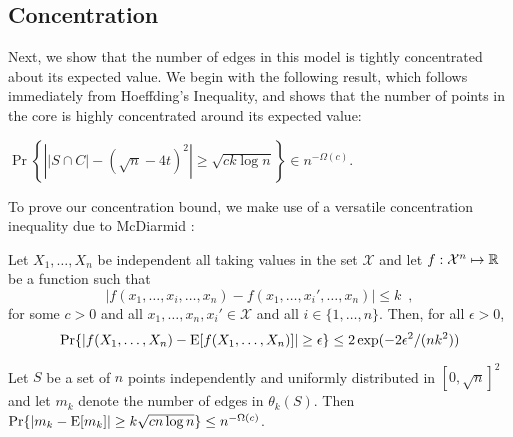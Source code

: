 \documentclass{patmorin}
\begin{document}
\subsection{Concentration}

Next, we show that the number of edges in this model is tightly
concentrated about its expected value.  We begin with the following
result, which follows immediately from Hoeffding's Inequality, and shows
that the number of points in the core is highly concentrated around its
expected value:
\begin{lem}
  $\Pr\left\{\left||S\cap C|-(\sqrt{n}-4t)^2\right| \ge \sqrt{ck\log n}\right\}
  \in n^{-\Omega(c)}$.
\end{lem}

To prove our concentration bound, we make use of a versatile concentration
inequality due to McDiarmid \cite{X}:

\begin{thm}
Let $X_1,\ldots,X_n$ be independent all taking values in the set
$\mathcal{X}$ and let $f:\mathcal{X}^n\mapsto\mathbb{R}$ be a function such that
\[
    |f(x_1,\ldots,x_i,\ldots,x_n) - f(x_1,\ldots,x_i',\ldots,x_n)|
    \le k \enspace ,
\]
for some $c>0$ and all $x_1,\ldots,x_n,x_i'\in \mathcal{X}$
and all $i\in\{1,\ldots,n\}$.
Then, for all $\epsilon > 0$,
\[
    \Pr\{|f(X_1,\ldots,X_n) - \mathrm{E}[f(X_1,\ldots,X_n)]| \ge \epsilon\}
       \le 2\exp(-2\epsilon^2/(nk^2))
\]
\end{thm}

\begin{lem}
 Let $S$ be a set of $n$ points independently and uniformly distributed
 in $[0,\sqrt{n}]^2$ and let $m_k$ denote the number of edges in $\theta_k(S)$.
 Then $\Pr\{|m_k-\mathrm{E}[m_k]| \ge k\sqrt{cn\log n}\} \le n^{-\Omega(c)}$.
\end{lem}
\end{document}
